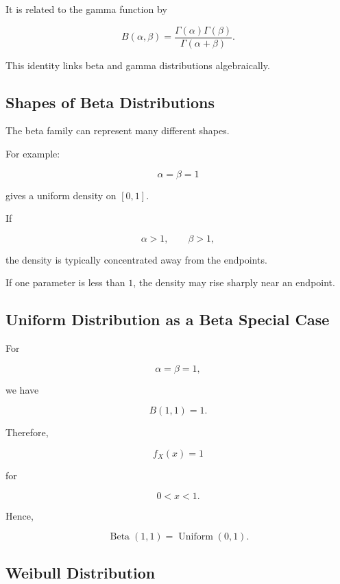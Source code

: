 It is related to the gamma function by

\[
\boxed{
B(\alpha,\beta)
=
\frac{
\Gamma(\alpha)\Gamma(\beta)
}{
\Gamma(\alpha+\beta)
}.
}
\]

This identity links beta and gamma distributions algebraically.

\subsection{Shapes of Beta Distributions}
\label{subsec:beta-shapes}

The beta family can represent many different shapes.

For example:

\[
\alpha=\beta=1
\]

gives a uniform density on \([0,1]\).

If

\[
\alpha>1,
\qquad
\beta>1,
\]

the density is typically concentrated away from the endpoints.

If one parameter is less than \(1\), the density may rise sharply near an
endpoint.

\subsection{Uniform Distribution as a Beta Special Case}
\label{subsec:uniform-beta-special-case}

For

\[
\alpha=\beta=1,
\]

we have

\[
B(1,1)=1.
\]

Therefore,

\[
f_X(x)=1
\]

for

\[
0<x<1.
\]

Hence,

\[
\boxed{
\operatorname{Beta}(1,1)
=
\operatorname{Uniform}(0,1).
}
\]

\subsection{Weibull Distribution}
\label{subsec:weibull-distribution}

